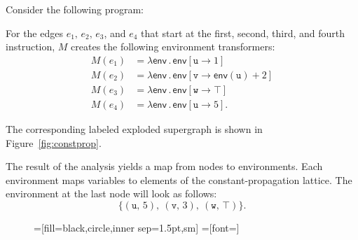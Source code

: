 {\begin{mdelete}
\begin{example}
  Consider the following program:

  For the edges $e_1,\,e_2,\,e_3$, and $e_4$ that start at the first, second, third, and fourth instruction, $M$ creates the following environment transformers:
  \begin{align*}
    M(e_1)
    &=\lambda\textsf{env}\,.\,\textsf{env}[\texttt u\to 1]\\
    M(e_2)
    &=\lambda\textsf{env}\,.\,\textsf{env}[\texttt v\to\textsf{env}(\texttt u)+2]\\
    M(e_3)
    &=\lambda\textsf{env}\,.\,\textsf{env}[\texttt w\to\top]\\
    M(e_4)
    &=\lambda\textsf{env}\,.\,\textsf{env}[\texttt u\to 5].
  \end{align*}
  
  The corresponding labeled exploded supergraph is shown in Figure~\ref{fig:constprop}.
  
  The result of the analysis yields a map from nodes to environments. Each environment maps variables to elements of the constant-propagation lattice. The environment at the last node will look as follows:
  \[
    \{(\texttt u,\,5),\ (\texttt v,\,3),\ (\texttt w,\,\top)\}.
  \]
\end{example}

\begin{figure}
  \centering
    =[fill=black,circle,inner sep=1.5pt,sm]
    =[font=\footnotesize]
\end{figure}
\end{mdelete}}
